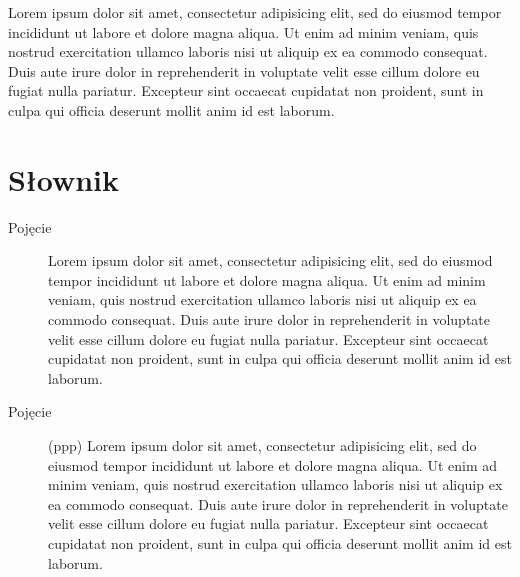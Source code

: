 \documentclass[a4paper,titlepage,twoside,openright]{report} %
\begin{document}
		Lorem ipsum dolor sit amet, consectetur adipisicing elit, sed do eiusmod tempor incididunt 
		ut labore et dolore magna aliqua. Ut enim ad 	minim veniam, quis nostrud exercitation 
		ullamco laboris nisi ut aliquip ex ea commodo consequat. Duis aute irure dolor in reprehenderit 
		in voluptate velit esse cillum dolore eu fugiat nulla pariatur. Excepteur sint occaecat 
		cupidatat non proident, sunt in culpa qui officia deserunt mollit anim id est laborum.
		
\cleardoublepage

\chapter*{Słownik}
		
		\begin{description}
			\item[Pojęcie]
				Lorem ipsum dolor sit amet, consectetur adipisicing elit, sed do eiusmod tempor incididunt 
				ut labore et dolore magna aliqua. Ut enim ad 	minim veniam, quis nostrud exercitation 
				ullamco laboris nisi ut aliquip ex ea commodo consequat. Duis aute irure dolor in reprehenderit 
				in voluptate velit esse cillum dolore eu fugiat nulla pariatur. Excepteur sint occaecat 
				cupidatat non proident, sunt in culpa qui officia deserunt mollit anim id est laborum.				
			\item[Pojęcie] (ppp) 
				Lorem ipsum dolor sit amet, consectetur adipisicing elit, sed do eiusmod tempor incididunt 
				ut labore et dolore magna aliqua. Ut enim ad 	minim veniam, quis nostrud exercitation 
				ullamco laboris nisi ut aliquip ex ea commodo consequat. Duis aute irure dolor in reprehenderit 
				in voluptate velit esse cillum dolore eu fugiat nulla pariatur. Excepteur sint occaecat 
				cupidatat non proident, sunt in culpa qui officia deserunt mollit anim id est laborum.
		\end{description}
\end{document}
